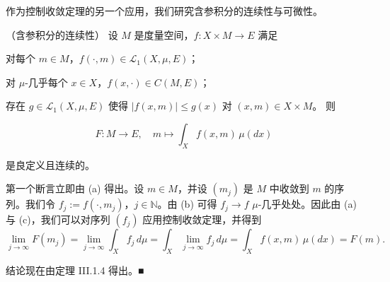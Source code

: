 作为控制收敛定理的另一个应用，我们研究含参积分的连续性与可微性。

\begin{theorem}

（含参积分的连续性） 设 $ M $ 是度量空间，$ f: X \times M \to E $ 满足

\begin{items}
\item

对每个 $ m \in M $，$ f(\cdot,m) \in \mathcal{L}_1(X,\mu,E) $；

\item

对 $ \mu $-几乎每个 $ x \in X $，$ f(x,\cdot) \in C(M,E) $；

\item

存在 $ g \in \mathcal{L}_1(X,\mu,E) $ 使得 $ |f(x,m)| \le g(x) $ 对 $ (x,m) \in X \times M $。
则

\[
F: M \to E, \quad m \mapsto \int_X f(x,m) \, \mu(dx)
\]

是良定义且连续的。

\proofhead
第一个断言立即由 (a) 得出。设 $ m \in M $，并设 $ (m_j) $ 是 $ M $ 中收敛到 $ m $ 的序列。我们令 $ f_j := f(\cdot,m_j) $，$ j \in \mathbb{N} $。由 (b) 可得 $ f_j \to f $ $ \mu $-几乎处处。因此由 (a) 与 (c)，我们可以对序列 $ (f_j) $ 应用控制收敛定理，并得到
\[
\lim_{j \to \infty} F(m_j) = \lim_{j \to \infty} \int_X f_j \, d\mu = \int_X \lim_{j \to \infty} f_j \, d\mu = \int_X f(x,m) \, \mu(dx) = F(m).
\]

结论现在由定理 III.1.4 得出。\nobreak\hspace{0.35em}■

\end{items}

\end{theorem}

